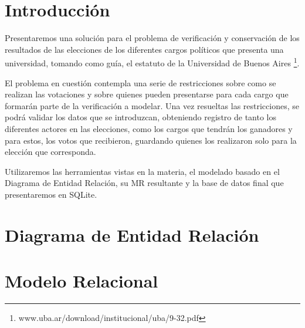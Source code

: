 \documentclass[a4paper, 10pt, twoside]{article}
\begin{document}
\newpage



\section{Introducción}
Presentaremos una solución para el problema de verificación y conservación de los resultados de las elecciones
de los diferentes cargos políticos que presenta una universidad, tomando como guía, el estatuto de la Universidad
de Buenos Aires \footnote{www.uba.ar/download/institucional/uba/9-32.pdf}.

El problema en cuestión contempla una serie de restricciones sobre como se realizan las votaciones y sobre quienes
pueden presentarse para cada cargo que formarán parte de la verificación a modelar. Una vez resueltas las restricciones,
se podrá validar los datos que se introduzcan, obteniendo registro de tanto los diferentes actores en las elecciones, como
los cargos que tendrán los ganadores y para estos, los votos que recibieron, guardando quienes los realizaron solo para la elección
que corresponda.

Utilizaremos las herramientas vistas en la materia, el modelado basado en el Diagrama de Entidad Relación, su
MR resultante y la base de datos final que presentaremos en SQLite.


\newpage




\section{Diagrama de Entidad Relación}




\section{Modelo Relacional}
\end{document}
